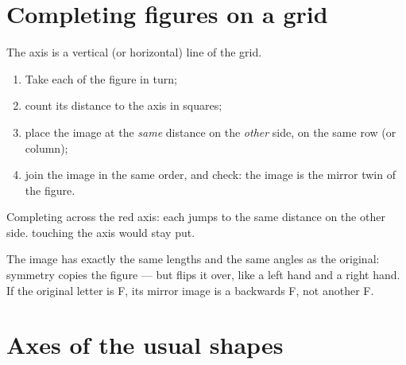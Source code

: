 \section{Completing figures on a grid}

\begin{method}\label{met:g4:symmetry:grid}
The axis is a vertical (or horizontal) line of the grid.
\begin{enumerate}
  \item Take each  of the figure in turn;
  \item count its distance to the axis in squares;
  \item place the image  at the \emph{same} distance on the
        \emph{other} side, on the same row (or column);
  \item join the image  in the same order, and check: the
        image is the mirror twin of the figure.
\end{enumerate}
\end{method}

\begin{omfigure}

{\small Completing across the red axis: each  jumps to the same
distance on the other side.  touching the axis would stay
put.}
\end{omfigure}

\begin{example}\label{ex:g4:symmetry:properties}
The image has exactly the same lengths and the same angles as the
original: symmetry copies the figure --- but flips it over, like a
left hand and a right hand. If the original letter is F, its mirror
image is a backwards F, not another F.
\end{example}

\section{Axes of the usual shapes}

